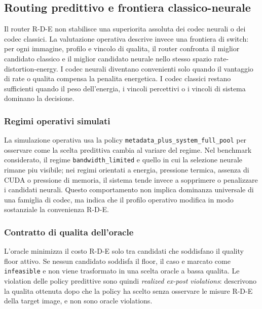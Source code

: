 \subsection{Routing predittivo e frontiera classico-neurale}
\label{sec:routing-predittivo-frontiera-classico-neurale}

Il router R-D-E non stabilisce una superiorita assoluta dei codec neurali
o dei codec classici. La valutazione operativa descrive invece una
frontiera di switch: per ogni immagine, profilo e vincolo di qualita, il
router confronta il miglior candidato classico e il miglior candidato
neurale nello stesso spazio rate-distortion-energy. I codec neurali
diventano convenienti solo quando il vantaggio di rate o qualita
compensa la penalita energetica. I codec classici restano sufficienti
quando il peso dell'energia, i vincoli percettivi o i vincoli di sistema
dominano la decisione.

\subsubsection{Regimi operativi simulati}



La simulazione operativa usa la policy
\texttt{metadata\_plus\_system\_full\_pool} per osservare come la scelta
predittiva cambia al variare del regime. Nel benchmark considerato, il
regime \texttt{bandwidth\_limited} e quello in cui la selezione neurale
rimane piu visibile; nei regimi orientati a energia, pressione termica,
assenza di CUDA o pressione di memoria, il sistema tende invece a
sopprimere o penalizzare i candidati neurali. Questo comportamento non
implica dominanza universale di una famiglia di codec, ma indica che il
profilo operativo modifica in modo sostanziale la convenienza R-D-E.

\subsubsection{Contratto di qualita dell'oracle}

L'oracle minimizza il costo R-D-E solo tra candidati che soddisfano il
quality floor attivo. Se nessun candidato soddisfa il floor, il caso e
marcato come \texttt{infeasible} e non viene trasformato in una scelta
oracle a bassa qualita. Le violation delle policy predittive sono
quindi \emph{realized ex-post violations}: descrivono la qualita
ottenuta dopo che la policy ha scelto senza osservare le misure R-D-E
della target image, e non sono oracle violations.

